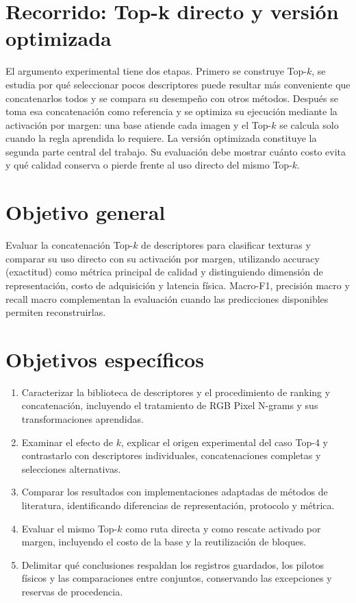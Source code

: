 \section{Recorrido: Top-k directo y versión optimizada}
El argumento experimental tiene dos etapas. Primero se construye Top-\(k\), se estudia por qué seleccionar pocos descriptores puede resultar más conveniente que concatenarlos todos y se compara su desempeño con otros métodos. Después se toma esa concatenación como referencia y se optimiza su ejecución mediante la activación por margen: una base atiende cada imagen y el Top-\(k\) se calcula solo cuando la regla aprendida lo requiere. La versión optimizada constituye la segunda parte central del trabajo. Su evaluación debe mostrar cuánto costo evita y qué calidad conserva o pierde frente al uso directo del mismo Top-\(k\).

\section{Objetivo general}
Evaluar la concatenación Top-\(k\) de descriptores para clasificar texturas y comparar su uso directo con su activación por margen, utilizando accuracy (exactitud) como métrica principal de calidad y distinguiendo dimensión de representación, costo de adquisición y latencia física. Macro-F1, precisión macro y recall macro complementan la evaluación cuando las predicciones disponibles permiten reconstruirlas.

\section{Objetivos específicos}
\begin{enumerate}
\item Caracterizar la biblioteca de descriptores y el procedimiento de ranking y concatenación, incluyendo el tratamiento de RGB Pixel N-grams y sus transformaciones aprendidas.
\item Examinar el efecto de \(k\), explicar el origen experimental del caso Top-4 y contrastarlo con descriptores individuales, concatenaciones completas y selecciones alternativas.
\item Comparar los resultados con implementaciones adaptadas de métodos de literatura, identificando diferencias de representación, protocolo y métrica.
\item Evaluar el mismo Top-\(k\) como ruta directa y como rescate activado por margen, incluyendo el costo de la base y la reutilización de bloques.
\item Delimitar qué conclusiones respaldan los registros guardados, los pilotos físicos y las comparaciones entre conjuntos, conservando las excepciones y reservas de procedencia.
\end{enumerate}

